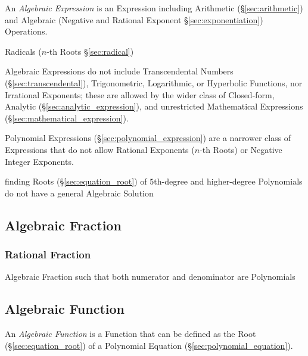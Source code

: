 An \emph{Algebraic Expression} is an Expression including Arithmetic
(\S\ref{sec:arithmetic}) and Algebraic (Negative and Rational Exponent
\S\ref{sec:exponentiation}) Operations.

Radicals ($n$-th Roots \S\ref{sec:radical})

Algebraic Expressions do not include Transcendental Numbers
(\S\ref{sec:transcendental}), Trigonometric, Logarithmic, or Hyperbolic
Functions, nor Irrational Exponents; these are allowed by the wider class of
Closed-form, Analytic (\S\ref{sec:analytic_expression}), and unrestricted
Mathematical Expressions (\S\ref{sec:mathematical_expression}).

\fist Polynomial Expressions (\S\ref{sec:polynomial_expression}) are a narrower
class of Expressions that do not allow Rational Exponents ($n$-th Roots) or
Negative Integer Exponents.

finding Roots (\S\ref{sec:equation_root}) of $5$th-degree and higher-degree
Polynomials do not have a general Algebraic Solution



\subsection{Algebraic Fraction}\label{sec:algebraic_fraction}

\subsubsection{Rational Fraction}\label{sec:rational_fraction}

Algebraic Fraction such that both numerator and denominator are Polynomials



\subsection{Algebraic Function}\label{sec:algebraic_function}

An \emph{Algebraic Function} is a Function that can be defined as the Root
(\S\ref{sec:equation_root}) of a Polynomial Equation
(\S\ref{sec:polynomial_equation}).

